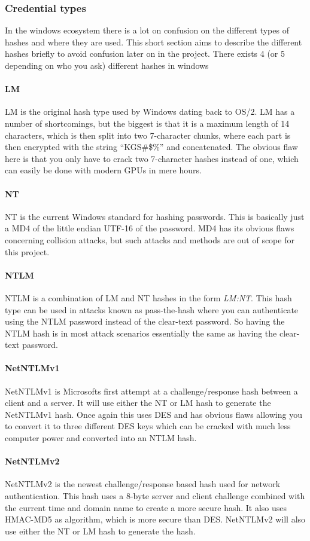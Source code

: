 \documentclass{article}
\begin{document}
\subsubsection{Credential types}
\label{sec:credential-types}
In the windows ecosystem there is a lot on confusion on the different types of hashes and where they are used. This short section aims to describe the different hashes briefly to avoid confusion later on in the project. There exists 4 (or 5 depending on who you ask) different hashes in windows\cite{url:hashes:hash-types}
\paragraph{LM}
LM is the original hash type used by Windows dating back to OS/2. LM has a number of shortcomings, but the biggest is that it is a maximum length of 14 characters, which is then split into two 7-character chunks, where each part is then encrypted with the string ``KGS\!\@\#\$\%'' and concatenated. The obvious flaw here is that you only have to crack two 7-character hashes instead of one, which can easily be done with modern GPUs in mere hours.
\paragraph{NT}
NT is the current Windows standard for hashing passwords. This is basically just a MD4 of the little endian UTF-16 of the password. MD4 has its obvious flaws concerning collision attacks, but such attacks and methods are out of scope for this project.
\paragraph{NTLM}
NTLM is a combination of LM and NT hashes in the form \emph{LM:NT}. This hash type can be used in attacks known as pass-the-hash\cite{url:microsoft:pass-the-hash-mitigation} where you can authenticate using the NTLM password instead of the clear-text password. So having the NTLM hash is in most attack scenarios essentially the same as having the clear-text password.
\paragraph{NetNTLMv1}
NetNTLMv1 is Microsofts first attempt at a challenge/response hash between a client and a server. It will use either the NT or LM hash to generate the NetNTLMv1 hash. Once again this uses DES and has obvious flaws allowing you to convert it to three different DES keys which can be cracked with much less computer power and converted into an NTLM hash\cite{url:hashes:netntlmv1-to-ntlm}.
\paragraph{NetNTLMv2}
NetNTLMv2 is the newest challenge/response based hash used for network authentication. This hash uses a 8-byte server and client challenge combined with the current time and domain name to create a more secure hash. It also uses HMAC-MD5 as algorithm, which is more secure than DES. NetNTLMv2 will also use either the NT or LM hash to generate the hash.

\end{document}
